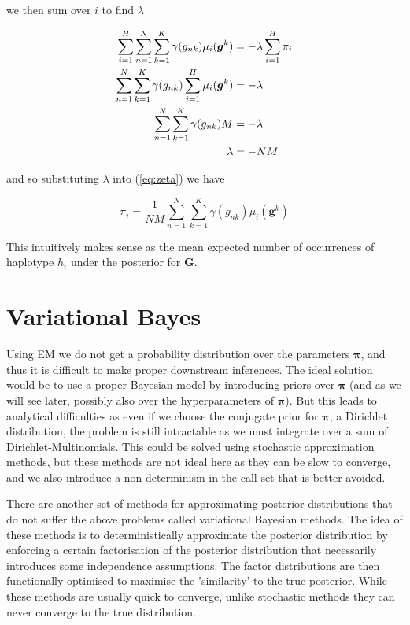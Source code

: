 \documentclass{article}
\begin{document}
we then sum over $i$ to find $\lambda$

\begin{align} 
    \sum_{i = 1}^H \sum_{n = 1}^N \sum_{k = 1}^K \gamma(g_{nk}) \mu_i(\boldsymbol{g}^k) &= -\lambda \sum_{i = 1}^H \pi_i \notag\\
      \sum_{n = 1}^N \sum_{k = 1}^K \gamma(g_{nk}) \sum_{i = 1}^H  \mu_i(\boldsymbol{g}^k) &= -\lambda \notag\\
      \sum_{n = 1}^N \sum_{k = 1}^K \gamma(g_{nk}) M &= -\lambda \notag\\
      \lambda &= -NM
\end{align}

and so substituting $\lambda$ into (\ref{eq:zeta}) we have

\begin{equation}
\label{eq:em_solution}
   \pi_i = \frac{1}{NM} \sum_{n = 1}^N \sum_{k = 1}^K \gamma(g_{nk}) \mu_i(\boldsymbol{g}^k)
\end{equation}

This intuitively makes sense as the mean expected number of occurrences of haplotype $h_i$ under the posterior for $\boldsymbol{G}$.

\section{Variational Bayes}

Using EM we do not get a probability distribution over the parameters $\boldsymbol{\pi}$, and thus it is difficult to make proper downstream inferences. The ideal solution would be to use a proper Bayesian model by introducing priors over $\boldsymbol{\pi}$ (and as we will see later, possibly also over the hyperparameters of $\boldsymbol{\pi}$). But this leads to analytical difficulties as even if we choose the conjugate prior for $\boldsymbol{\pi}$, a Dirichlet distribution, the problem is still intractable as we must integrate over a sum of Dirichlet-Multinomials. This could be solved using stochastic approximation methods, but these methods are not ideal here as they can be slow to converge, and we also introduce a non-determinism in the call set that is better avoided.

There are another set of methods for approximating posterior distributions that do not suffer the above problems called variational Bayesian methods. The idea of these methods is to deterministically approximate the posterior distribution by enforcing a certain factorisation of the posterior distribution that necessarily introduces some independence assumptions. The factor distributions are then functionally optimised to maximise the 'similarity' to the true posterior. While these methods are usually quick to converge, unlike stochastic methods they can never converge to the true distribution.
\end{document}
